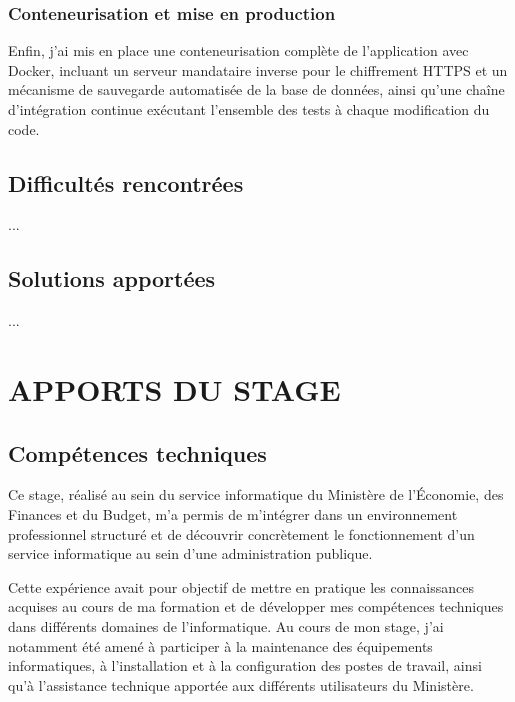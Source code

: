 \documentclass[12pt,a4paper]{article}
\begin{document}
\subsubsection{Conteneurisation et mise en production}

Enfin, j'ai mis en place une conteneurisation complète de l'application avec Docker, incluant un serveur mandataire inverse pour le chiffrement HTTPS et un mécanisme de sauvegarde automatisée de la base de données, ainsi qu'une chaîne d'intégration continue exécutant l'ensemble des tests à chaque modification du code.

\subsection{Difficultés rencontrées}

...

\subsection{Solutions apportées}

...


\section{APPORTS DU STAGE}

\subsection{Compétences techniques}

Ce stage, réalisé au sein du service informatique du Ministère de l’Économie, des Finances et du Budget, m’a permis de m’intégrer dans un environnement professionnel structuré et de découvrir concrètement le fonctionnement d’un service informatique au sein d’une administration publique.

Cette expérience avait pour objectif de mettre en pratique les connaissances acquises au cours de ma formation et de développer mes compétences techniques dans différents domaines de l’informatique. Au cours de mon stage, j’ai notamment été amené à participer à la maintenance des équipements informatiques, à l’installation et à la configuration des postes de travail, ainsi qu’à l’assistance technique apportée aux différents utilisateurs du Ministère.
\end{document}
